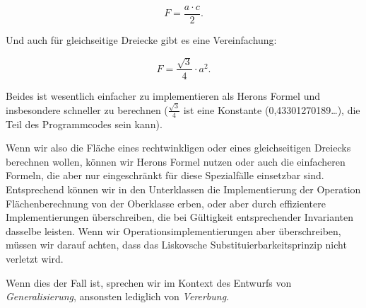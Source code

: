 $$F = \frac{a \cdot c}{2}.$$

Und auch für gleichseitige Dreiecke gibt es eine Vereinfachung: 

$$ F = \frac{\sqrt{3}}{4} \cdot a^2 .$$

Beides ist wesentlich einfacher zu implementieren als Herons Formel und insbesondere schneller zu berechnen ($\frac{\sqrt{3}}{4}$ ist eine Konstante (0,43301270189…), die Teil des Programmcodes sein kann). 
		
Wenn wir also die Fläche eines rechtwinkligen oder eines gleichseitigen Dreiecks berechnen wollen, können wir Herons Formel nutzen oder auch die einfacheren Formeln, die aber nur eingeschränkt für diese Spezialfälle einsetzbar sind. Entsprechend können wir in den Unterklassen die Implementierung der Operation Flächenberechnung von der Oberklasse erben, oder aber durch effizientere Implementierungen überschreiben, die bei Gültigkeit entsprechender Invarianten dasselbe leisten. Wenn wir Operationsimplementierungen aber überschreiben, müssen wir darauf achten, dass das Liskovsche Substituierbarkeitsprinzip nicht verletzt wird.

\vspace{-2mm} %


\vspace{-5mm} %


\pagebreak %

Wenn dies der Fall ist, sprechen wir im Kontext des Entwurfs von \textit{Generalisierung}, ansonsten lediglich von \textit{Vererbung}.

